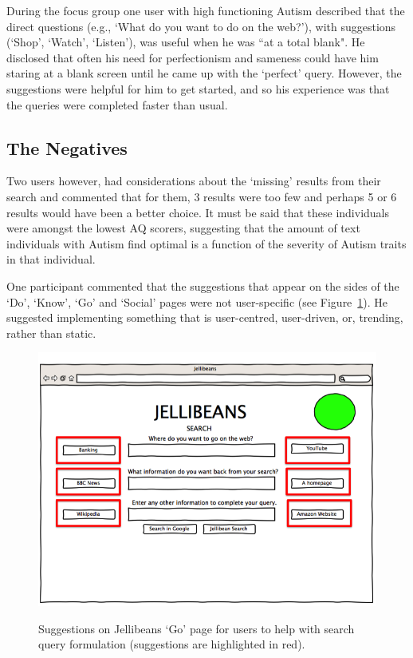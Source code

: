 \documentclass[a4paper, 11pt]{article}
\begin{document}
\vspace{5mm}
During the focus group one user with high functioning Autism described that the direct questions (e.g., `What do you want to do on the web?'), with suggestions (`Shop', `Watch', `Listen'), was useful when he was ``at a total blank". He disclosed that often his need for perfectionism and sameness could have him staring at a blank screen until he came up with the `perfect' query. However, the suggestions were helpful for him to get started, and so his experience was that the queries were completed faster than usual.  \\

\subsection{The Negatives}

Two users however, had considerations about the `missing' results from their search and commented that for them, 3 results were too few and perhaps 5 or 6 results would have been a better choice. It must be said that these individuals were amongst the lowest AQ scorers, suggesting that the amount of text individuals with Autism find optimal is a function of the severity of Autism traits in that individual.

\vspace{5mm}
One participant commented that the suggestions that appear on the sides of the `Do', `Know', `Go' and `Social' pages were not user-specific (see Figure~\ref{suggestions}). He suggested implementing something that is user-centred, user-driven, or, trending, rather than static.

\begin{figure}[H]
\begin{center}
\includegraphics[scale=0.3]{suggestions}\\
\caption{Suggestions on Jellibeans `Go' page for users to help with search query formulation (suggestions are highlighted in red).}
\label{suggestions}
\end{center}
\end{figure}
\end{document}

